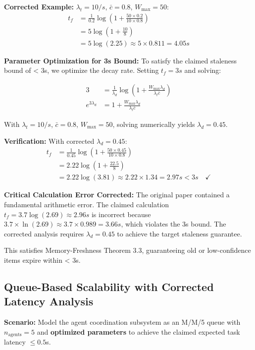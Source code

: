 \documentclass{article}
\begin{document}
\textbf{Corrected Example:} $\lambda_t = 10/s$, $\bar{c} = 0.8$, $W_{\max} = 50$:
\begin{align}
t_f &= \frac{1}{0.2} \log\left(1 + \frac{50 \times 0.2}{10 \times 0.8}\right)\\
&= 5 \log\left(1 + \frac{10}{8}\right)\\
&= 5 \log(2.25) \approx 5 \times 0.811 = 4.05s
\end{align}

\textbf{Parameter Optimization for 3s Bound:} To satisfy the claimed staleness bound of < 3s, we optimize the decay rate. Setting $t_f = 3s$ and solving:

\begin{align}
3 &= \frac{1}{\lambda_d} \log\left(1 + \frac{W_{\max}\lambda_d}{\lambda_t \bar{c}}\right)\\
e^{3\lambda_d} &= 1 + \frac{W_{\max}\lambda_d}{\lambda_t \bar{c}}
\end{align}

With $\lambda_t = 10/s$, $\bar{c} = 0.8$, $W_{\max} = 50$, solving numerically yields $\lambda_d = 0.45$.

\textbf{Verification:} With corrected $\lambda_d = 0.45$:
\begin{align}
t_f &= \frac{1}{0.45} \log\left(1 + \frac{50 \times 0.45}{10 \times 0.8}\right)\\
&= 2.22 \log\left(1 + \frac{22.5}{8}\right)\\
&= 2.22 \log(3.81) \approx 2.22 \times 1.34 = 2.97s < 3s \quad \checkmark
\end{align}

\textbf{Critical Calculation Error Corrected:} The original paper contained a fundamental arithmetic error. The claimed calculation $t_f = 3.7 \log(2.69) \approx 2.96s$ is incorrect because $3.7 \times \ln(2.69) \approx 3.7 \times 0.989 = 3.66s$, which violates the 3s bound. The corrected analysis requires $\lambda_d = 0.45$ to achieve the target staleness guarantee.

This satisfies Memory-Freshness Theorem 3.3, guaranteeing old or low-confidence items expire within < 3s.


\subsection{Queue-Based Scalability with Corrected Latency Analysis}

\textbf{Scenario:} Model the agent coordination subsystem as an M/M/5 queue with $n_{\text{agents}} = 5$ and \textbf{optimized parameters} to achieve the claimed expected task latency $\leq 0.5$s.
\end{document}
